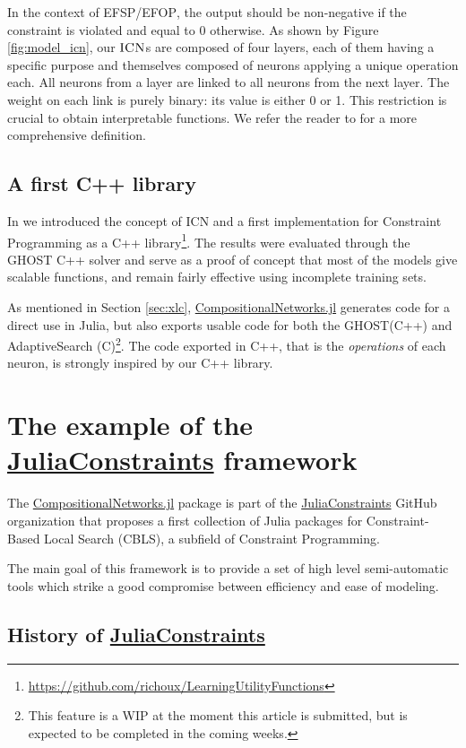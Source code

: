 \documentclass{juliacon}
\newcommand{\efsp}{\textsc{EFSP}\xspace}
\newcommand{\efop}{\textsc{EFOP}\xspace}
\newcommand{\icn}{\textsc{ICN}\xspace}
\newcommand{\jc}{\href{https://github.com/JuliaConstraints}{JuliaConstraints}\xspace}
\newcommand{\cnjl}{\href{https://github.com/JuliaConstraints/CompositionalNetworks.jl}{CompositionalNetworks.jl}\xspace}
\begin{document}
In the context of \efsp/\efop, the output should be non-negative if the constraint is violated and equal to 0 otherwise. As shown by Figure \ref{fig:model_icn}, our \(\icn\)s are
composed of four layers, each of them having a specific purpose and
themselves composed of neurons applying  a unique operation each.  All
neurons  from  a  layer  are  linked to  all  neurons  from  the  next
layer. The weight on each link is purely binary: its value is either 0
or 1. This restriction is  crucial to obtain interpretable functions. We refer the reader to \cite{richoux2020automatic} for a more comprehensive definition.

\subsection{A first C++ library}
\label{subsec:cplusplus}

In \cite{richoux2020automatic} we introduced the concept of ICN and a first implementation for Constraint Programming as a C++ library\footnote{\url{https://github.com/richoux/LearningUtilityFunctions}}. The results were evaluated through the GHOST C++ solver \cite{richoux2016ghost} and serve as a proof of concept that most of the models give scalable functions, and remain fairly effective using incomplete training sets.

As mentioned in Section \ref{sec:xlc}, \cnjl generates code for a direct use in Julia, but also exports usable code for both the GHOST(C++) and AdaptiveSearch (C)\footnote{This feature is a WIP at the moment this article is submitted, but is expected to be completed in the coming weeks.}. The code exported in C++, that is the \emph{operations} of each neuron, is strongly inspired by our C++ library.

\section{The example of the \jc framework}
\label{sec:juliaconstraints}

The \cnjl package is part of the \jc GitHub organization that proposes a first collection of Julia packages for Constraint-Based Local Search (CBLS), a subfield of Constraint Programming.

The main goal of this framework is to provide a set of high level semi-automatic tools which strike a good compromise between efficiency and ease of modeling.

\subsection{History of \jc}
\label{subsec:history}
\end{document}
